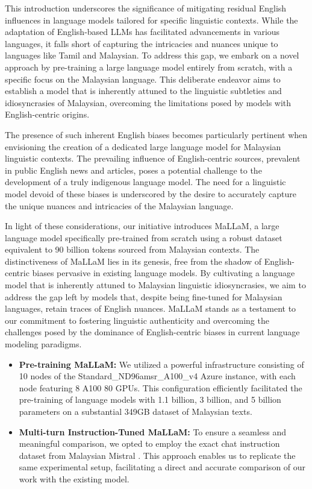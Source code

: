 \documentclass{article}
\begin{document}
This introduction underscores the significance of mitigating residual English influences in language models tailored for specific linguistic contexts. While the adaptation of English-based LLMs has facilitated advancements in various languages, it falls short of capturing the intricacies and nuances unique to languages like Tamil and Malaysian. To address this gap, we embark on a novel approach by pre-training a large language model entirely from scratch, with a specific focus on the Malaysian language. This deliberate endeavor aims to establish a model that is inherently attuned to the linguistic subtleties and idiosyncrasies of Malaysian, overcoming the limitations posed by models with English-centric origins.

The presence of such inherent English biases becomes particularly pertinent when envisioning the creation of a dedicated large language model for Malaysian linguistic contexts. The prevailing influence of English-centric sources, prevalent in public English news and articles, poses a potential challenge to the development of a truly indigenous language model. The need for a linguistic model devoid of these biases is underscored by the desire to accurately capture the unique nuances and intricacies of the Malaysian language.

In light of these considerations, our initiative introduces MaLLaM, a large language model specifically pre-trained from scratch using a robust dataset equivalent to 90 billion tokens sourced from Malaysian contexts. The distinctiveness of MaLLaM lies in its genesis, free from the shadow of English-centric biases pervasive in existing language models. By cultivating a language model that is inherently attuned to Malaysian linguistic idiosyncrasies, we aim to address the gap left by models that, despite being fine-tuned for Malaysian languages, retain traces of English nuances. MaLLaM stands as a testament to our commitment to fostering linguistic authenticity and overcoming the challenges posed by the dominance of English-centric biases in current language modeling paradigms.

\begin{itemize}
  \item \textbf{Pre-training MaLLaM:} We utilized a powerful infrastructure consisting of 10 nodes of the Standard\_ND96amsr\_A100\_v4 Azure instance, with each node featuring 8 A100 80 GPUs. This configuration efficiently facilitated the pre-training of language models with 1.1 billion, 3 billion, and 5 billion parameters on a substantial 349GB dataset of Malaysian texts.

  \item \textbf{Multi-turn Instruction-Tuned MaLLaM:} To ensure a seamless and meaningful comparison, we opted to employ the exact chat instruction dataset from Malaysian Mistral \cite{zolkepli2024large}. This approach enables us to replicate the same experimental setup, facilitating a direct and accurate comparison of our work with the existing model.
\end{itemize}
\end{document}
